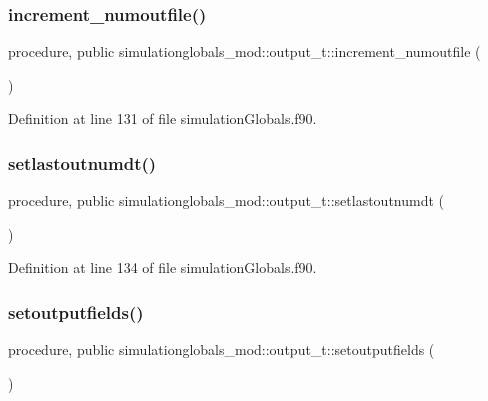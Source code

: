 \subsubsection{\texorpdfstring{increment\+\_\+numoutfile()}{increment\_numoutfile()}}
{\footnotesize\ttfamily procedure, public simulationglobals\+\_\+mod\+::output\+\_\+t\+::increment\+\_\+numoutfile (\begin{DoxyParamCaption}{ }\end{DoxyParamCaption})}



Definition at line 131 of file simulation\+Globals.\+f90.

\mbox{\label{structsimulationglobals__mod_1_1output__t_a7208aae153eb3f3c90bb547aef268012}} 
\subsubsection{\texorpdfstring{setlastoutnumdt()}{setlastoutnumdt()}}
{\footnotesize\ttfamily procedure, public simulationglobals\+\_\+mod\+::output\+\_\+t\+::setlastoutnumdt (\begin{DoxyParamCaption}{ }\end{DoxyParamCaption})}



Definition at line 134 of file simulation\+Globals.\+f90.

\mbox{\label{structsimulationglobals__mod_1_1output__t_abf1812daba1e60e7a570a49e14502b11}} 
\subsubsection{\texorpdfstring{setoutputfields()}{setoutputfields()}}
{\footnotesize\ttfamily procedure, public simulationglobals\+\_\+mod\+::output\+\_\+t\+::setoutputfields (\begin{DoxyParamCaption}{ }\end{DoxyParamCaption})}



